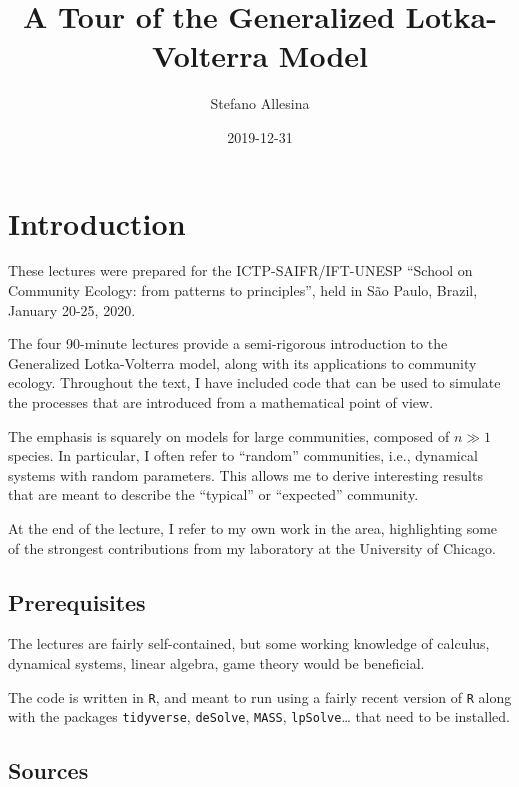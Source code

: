 \documentclass[]{book}
\title{A Tour of the Generalized Lotka-Volterra Model}
\author{Stefano Allesina}
\date{2019-12-31}
\begin{document}
\maketitle

{
\setcounter{tocdepth}{1}
\tableofcontents
}
\hypertarget{introduction}{%
\chapter{Introduction}\label{introduction}}

These lectures were prepared for the ICTP-SAIFR/IFT-UNESP ``School on Community Ecology: from patterns to principles'', held in São Paulo, Brazil, January 20-25, 2020.

The four 90-minute lectures provide a semi-rigorous introduction to the Generalized Lotka-Volterra model, along with its applications to community ecology. Throughout the text, I have included code that can be used to simulate the processes that are introduced from a mathematical point of view.

The emphasis is squarely on models for large communities, composed of \(n \gg 1\) species. In particular, I often refer to ``random'' communities, i.e., dynamical systems with random parameters. This allows me to derive interesting results that are meant to describe the ``typical'' or ``expected'' community.

At the end of the lecture, I refer to my own work in the area, highlighting some of the strongest contributions from my laboratory at the University of Chicago.

\hypertarget{prerequisites}{%
\section{Prerequisites}\label{prerequisites}}

The lectures are fairly self-contained, but some working knowledge of calculus, dynamical systems, linear algebra, game theory would be beneficial.

The code is written in \texttt{R}, and meant to run using a fairly recent version of \texttt{R} along with the packages \texttt{tidyverse}, \texttt{deSolve}, \texttt{MASS}, \texttt{lpSolve}\ldots{} that need to be installed.

\hypertarget{sources}{%
\section{Sources}\label{sources}}
\end{document}
